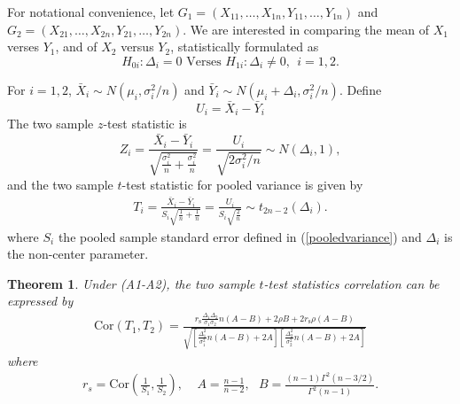\documentclass[12pt, a4paper]{article}
\newtheorem{theorem}{Theorem}       %
\begin{document}
\begin{appendix}
			For notational convenience, let $G_1 = (X_{11}, \ldots, X_{1n}, Y_{11}, \ldots, Y_{1n})$ and $G_2 = 
			(X_{21}, \ldots, X_{2n}, Y_{21}, \ldots, Y_{2n})$. We are interested in comparing the mean of $X_1$
			verses $Y_1$, and of $X_2$ versus $Y_2$, statistically formulated as
			\begin{equation}\label{hypotheses1}
			H_{0i}:  \Delta_i = 0 \text{     Verses   }  H_{1i}: \Delta_i\neq 0 ,  ~~ i = 1, 2.
			\end{equation}
			
			
			For $i =1, 2$,  $\bar{X}_{i}\sim N(\mu_i, \sigma_i^2/n)$ and $\bar{Y}_{i}\sim N(\mu_i + \Delta_i,
			\sigma_i^2/n)$. Define
			\begin{equation}\label{expreU}
			U_i = \bar{X}_i - \bar{Y}_i
			\end{equation}
			The two sample $z$-test statistic is
			\begin{equation}\label{zTest}
			Z_i = \frac{\bar{X}_{i}-\bar{Y}_{i} }{\sqrt{\frac{\sigma^2_i}{n} + \frac{\sigma^2_i}{n}}} =
			\frac{U_i}{\sqrt{2\sigma_i^2/n}}\sim N(\Delta_i, 1) ,
			\end{equation}
			and the two sample $t$-test statistic for pooled variance is given by
			\begin{align}\label{t-test}
			T_i = \frac{\bar{X}_i - \bar{Y}_i}{S_i\sqrt{\frac{1}{n}+\frac{1}{n}}} =
			\frac{U_i}{S_i\sqrt{\frac{2}{n}}} \sim t_{2n-2}(\Delta_i). 
			\end{align}
			where $S_i$ the pooled sample standard error defined in (\ref{pooledvariance}) and $\Delta_i$ is the
			non-center parameter. 
		
			\begin{theorem}\label{theoremTstat} 
				Under (A1-A2),  the two sample $t$-test statistics correlation can be expressed by 
				\begin{align}\label{tTestCorrelation}
				\text{Cor}(T_1, T_2)  = \frac{r_{\text{s}}\frac{\Delta_1\Delta_2}{\sigma_1\sigma_2}n(A-B) + 2\rho B
					+ 2r_{\text{s}}\rho(A-B)}{\sqrt{\left[ \frac{\Delta_1^2}{\sigma_1^2}n(A-B) + 2
						A\right]\left[\frac{\Delta_2^2}{\sigma_2^2}n(A-B) + 2 A\right]}}
				\end{align} where 
				\begin{align}\label{invScor}
				r_s = \text{Cor}(\frac{1}{S_1}, \frac{1}{S_2}), ~~~~~A = \frac{n-1}{n-2}, ~~~B =
				\frac{(n-1)\Gamma^2(n-3/2)}{\Gamma^2(n-1)}.
				\end{align}
			\end{theorem}
		

\end{appendix}
\end{document}
